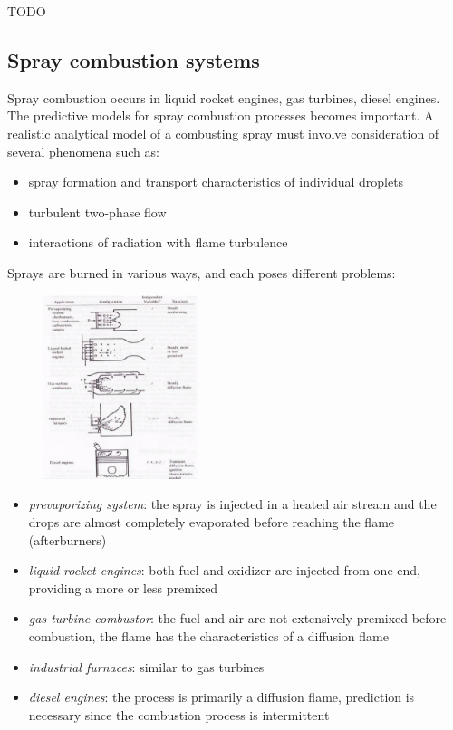 \documentclass[12pt]{article}
\begin{document}
TODO

\subsection{Spray combustion systems}

Spray combustion occurs in liquid rocket engines, gas turbines, diesel engines. The predictive models for spray combustion processes becomes important. A realistic analytical model of a combusting spray must involve consideration of several phenomena such as:
\begin{itemize}
    \item spray formation and transport characteristics of individual droplets
    \item turbulent two-phase flow
    \item interactions of radiation with flame turbulence
\end{itemize}

Sprays are burned in various ways, and each poses different problems:

\begin{figure}[h!]
\centering
\includegraphics[width=0.4\textwidth]{figures/spraycomb.png}
\end{figure}

\begin{itemize}
    \item \textit{prevaporizing system}: the spray is injected in a heated air stream and the drops are almost completely evaporated before reaching the flame (afterburners)
    \item \textit{liquid rocket engines}: both fuel and oxidizer are injected from one end, providing a more or less premixed
    \item \textit{gas turbine combustor}: the fuel and air are not extensively premixed before combustion, the flame has the characteristics of a diffusion flame
    \item \textit{industrial furnaces}: similar to gas turbines
    \item \textit{diesel engines}: the process is primarily a diffusion flame, prediction is necessary since the combustion process is intermittent
\end{itemize}
\end{document}
